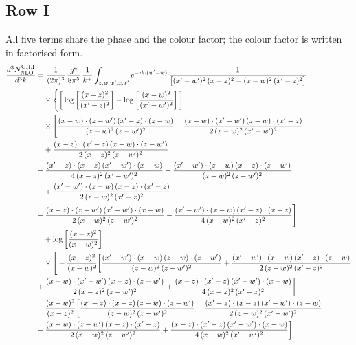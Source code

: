 \documentclass[9pt]{article}
\numberwithin{equation}{section}
\begin{document}
\subsection{Row I}
All five terms share the phase and the colour factor; the colour factor is written in factorised form.
\begin{align}
\frac{d^{3}N^{\rm GII,I}_{\rm NLO}}{d^{3}k}&=\frac{1}{(2\pi)^{3}}\,\frac{g^{4}}{8\pi^{5}}\,\frac{1}{k^{+}}\int_{z,w,w^{\prime},x,x^{\prime}}e^{-ik\cdot(w^{\prime}-w)}\,\frac{1}{\big[(x^{\prime}-w^{\prime})^{2}\,(x-z)^{2}-(x-w)^{2}\,(x^{\prime}-z)^{2}\big]}\notag\\&\quad\times\Bigg\{\bigg[\log\left[\frac{(x-z)^{2}}{(x^{\prime}-z)^{2}}\right]-\log\left[\frac{(x-w)^{2}}{(x^{\prime}-w^{\prime})^{2}}\right]\bigg]\notag\\&\quad\times\Bigg[\frac{(x-w)\cdot(z-w^{\prime})\,(x^{\prime}-z)\cdot(z-w)}{(z-w)^{2}\,(z-w^{\prime})^{2}}-\frac{(x-w)\cdot(x^{\prime}-w^{\prime})\,(z-w)\cdot(x^{\prime}-z)}{2\,(z-w)^{2}\,(x^{\prime}-w^{\prime})^{2}}\notag\\
&\quad +\frac{(x-z)\cdot(x^{\prime}-z)\,(x-w)\cdot(z-w^{\prime})}{2\,(x-z)^{2}\,(z-w^{\prime})^{2}}\notag \\ & -\frac{(x^{\prime}-z)\cdot(x-z)\,(x^{\prime}-w^{\prime})\cdot(x-w)}{4\,(x-z)^{2}\,(x^{\prime}-w^{\prime})^{2}}+\frac{(x^{\prime}-w^{\prime})\cdot(z-w)\,(x-z)\cdot(z-w^{\prime})}{(z-w)^{2}\,(z-w^{\prime})^{2}} \notag\\
&\quad +\frac{(x^{\prime}-w^{\prime})\cdot(z-w)\,(x-z)\cdot(x^{\prime}-z)}{2\,(z-w)^{2}\,(x^{\prime}-z)^{2}}\notag \\ & -\frac{(x-z)\cdot(z-w^{\prime})\,(x^{\prime}-w^{\prime})\cdot(x-w)}{2\,(x-w)^{2}\,(z-w^{\prime})^{2}}  -\frac{(x^{\prime}-w^{\prime})\cdot(x-w)\,(x^{\prime}-z)\cdot(x-z)}{4\,(x-w)^{2}\,(x^{\prime}-z)^{2}}\Bigg]\notag\\&\quad+\log\left[\frac{(x-z)^{2}}{(x-w)^{2}}\right]\notag\\&\quad\times\Bigg[-\frac{(x-z)^{2}}{(x-w)^{2}}\bigg[\frac{(x^{\prime}-w^{\prime})\cdot(x-w)\,(z-w)\cdot(z-w^{\prime})}{(z-w)^{2}\,(z-w^{\prime})^{2}}+\frac{(x^{\prime}-w^{\prime})\cdot(x-w)\,(x^{\prime}-z)\cdot(z-w)}{2\,(z-w)^{2}\,(x^{\prime}-z)^{2}}\notag \\ & +\frac{(x-w)\cdot(x^{\prime}-w^{\prime})\,(x-z)\cdot(z-w^{\prime})}{2\,(x-z)^{2}\,(z-w^{\prime})^{2}}+\frac{(x-z)\cdot(x^{\prime}-z)\,(x^{\prime}-w^{\prime})\cdot(x-w)}{4\,(x-z)^{2}\,(x^{\prime}-z)^{2}}\bigg]\notag\\
&-\frac{(x-w)^{2}}{(x-z)^{2}}\bigg[\frac{(x^{\prime}-z)\cdot(x-z)\,(z-w)\cdot(z-w^{\prime})}{(z-w)^{2}\,(z-w^{\prime})^{2}}-\frac{(x^{\prime}-z)\cdot(x-z)\,(x^{\prime}-w^{\prime})\cdot(z-w)}{2\,(z-w)^{2}\,(x^{\prime}-w^{\prime})^{2}}\notag \\ & -\frac{(x-w)\cdot(z-w^{\prime})\,(x-z)\cdot(x^{\prime}-z)}{2\,(x-w)^{2}\,(z-w^{\prime})^{2}}+\frac{(x-z)\cdot(x^{\prime}-z)\,(x^{\prime}-w^{\prime})\cdot(x-w)}{4\,(x-w)^{2}\,(x^{\prime}-w^{\prime})^{2}}\bigg]\notag\\

\end{align}
\end{document}
